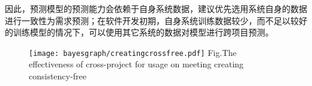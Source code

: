 因此，预测模型的预测能力会依赖于自身系统数据，建议优先选用系统自身的数据进行一致性为需求预测；在软件开发初期，自身系统训练数据较少，而不足以较好的训练模型的情况下，可以使用其它系统的数据对模型进行跨项目预测。

\begin{figure}[htbp]
\centering
\texttt{[image: bayesgraph/creatingcrossfree.pdf]}
{Fig.$\!$}{The effectiveness of cross-project for usage on meeting creating consistency-free}
\vspace{-1em}
\end{figure}


